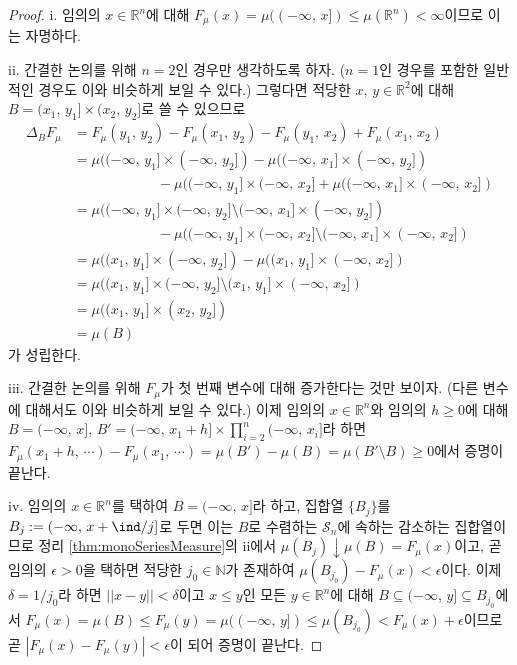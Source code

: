 \begin{proof}
    i. 임의의 $x\in\mathbb{R}^n$에 대해 $F_\mu(x)=\mu((-\infty,\,x])\leq\mu(\mathbb{R}^n)<\infty$이므로 이는 자명하다.

    ii. 간결한 논의를 위해 $n=2$인 경우만 생각하도록 하자. ($n=1$인 경우를 포함한 일반적인 경우도 이와 비슷하게 보일 수 있다.) 그렇다면 적당한 $x,\,y\in\mathbb{R}^2$에 대해 $B=(x_1,\,y_1]\times(x_2,\,y_2]$로 쓸 수 있으므로
    \begin{align*}
        \Delta_BF_\mu&=F_\mu(y_1,\,y_2)-F_\mu(x_1,\,y_2)-F_\mu(y_1,\,x_2)+F_\mu(x_1,\,x_2)\\
        &=\mu((-\infty,\,y_1]\times(-\infty,\,y_2])-\mu((-\infty,\,x_1]\times(-\infty,\,y_2])\\
        &\qquad\qquad\qquad-\mu((-\infty,\,y_1]\times(-\infty,\,x_2]+\mu((-\infty,\,x_1]\times(-\infty,\,x_2])\\
        &=\mu((-\infty,\,y_1]\times(-\infty,\,y_2]\setminus(-\infty,\,x_1]\times(-\infty,\,y_2])\\
        &\qquad\qquad\qquad-\mu((-\infty,\,y_1]\times(-\infty,\,x_2]\setminus(-\infty,\,x_1]\times(-\infty,\,x_2])\\
        &=\mu((x_1,\,y_1]\times(-\infty,\,y_2])-\mu((x_1,\,y_1]\times(-\infty,\,x_2])\\
        &=\mu((x_1,\,y_1]\times(-\infty,\,y_2]\setminus(x_1,\,y_1]\times(-\infty,\,x_2])\\
        &=\mu((x_1,\,y_1]\times(x_2,\,y_2])\\
        &=\mu(B)
    \end{align*}
    가 성립한다.

    iii. 간결한 논의를 위해 $F_\mu$가 첫 번째 변수에 대해 증가한다는 것만 보이자. (다른 변수에 대해서도 이와 비슷하게 보일 수 있다.) 이제 임의의 $x\in\mathbb{R}^n$와 임의의 $h\geq0$에 대해 $B=(-\infty,\,x],\,B'=(-\infty,\,x_1+h]\times\prod_{i=2}^{n}(-\infty,\,x_i]$라 하면 $F_\mu(x_1+h,\,\cdots)-F_\mu(x_1,\,\cdots)=\mu(B')-\mu(B)=\mu(B'\setminus B)\geq0$에서 증명이 끝난다.

    iv. 임의의 $x\in\mathbb{R}^n$를 택하여 $B=(-\infty,\,x]$라 하고, 집합열 $\{B_j\}$를 $B_j:=(-\infty,\,x+\ind/j]$로 두면 이는 $B$로 수렴하는 $\mathcal{S}_n$에 속하는 감소하는 집합열이므로 정리 \ref{thm:monoSeriesMeasure}의 ii에서 $\mu(B_j)\downarrow\mu(B)=F_\mu(x)$이고, 곧 임의의 $\epsilon>0$을 택하면 적당한 $j_0\in\mathbb{N}$가 존재하여 $\mu(B_{j_0})-F_\mu(x)<\epsilon$이다. 이제 $\delta=1/j_0$라 하면 $||x-y||<\delta$이고 $x\leq y$인 모든 $y\in\mathbb{R}^n$에 대해 $B\subseteq(-\infty,\,y]\subseteq B_{j_0}$에서 $F_\mu(x)=\mu(B)\leq F_\mu(y)=\mu((-\infty,\,y])\leq\mu(B_{j_0})<F_\mu(x)+\epsilon$이므로 곧 $|F_\mu(x)-F_\mu(y)|<\epsilon$이 되어 증명이 끝난다.


\end{proof}
